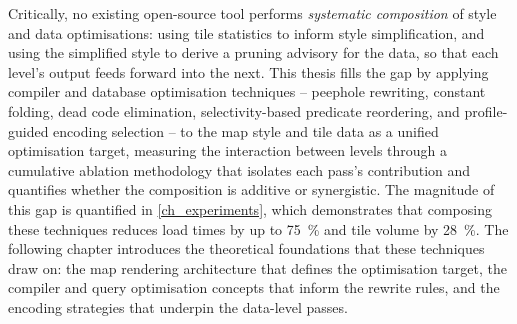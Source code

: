 Critically, no existing open-source tool performs \emph{systematic composition} of style and data optimisations: using tile statistics to inform style simplification, and using the simplified style to derive a pruning advisory for the data, so that each level's output feeds forward into the next.
This thesis fills the gap by applying compiler and database optimisation techniques -- peephole rewriting, constant folding, dead code elimination, selectivity-based predicate reordering, and profile-guided encoding selection -- to the map style and tile data as a unified optimisation target, measuring the interaction between levels through a cumulative ablation methodology that isolates each pass's contribution and quantifies whether the composition is additive or synergistic.
The magnitude of this gap is quantified in \cref{ch_experiments}, which demonstrates that composing these techniques reduces load times by up to \qty{75}{\percent} and tile volume by \qty{28}{\percent}.
The following chapter introduces the theoretical foundations that these techniques draw on: the map rendering architecture that defines the optimisation target, the compiler and query optimisation concepts that inform the rewrite rules, and the encoding strategies that underpin the data-level passes.
